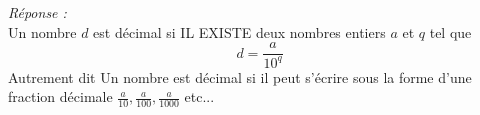 \textit{Réponse : }\\

Un nombre $d$ est décimal si IL EXISTE deux nombres entiers $a$ et $q$ tel que  \[
d = \frac{a}{10^q}
\] 
Autrement dit Un nombre est décimal si il peut s'écrire sous la forme d'une fraction décimale $\frac{a}{10}, \frac{a}{100}, \frac{a}{1000}$ etc...